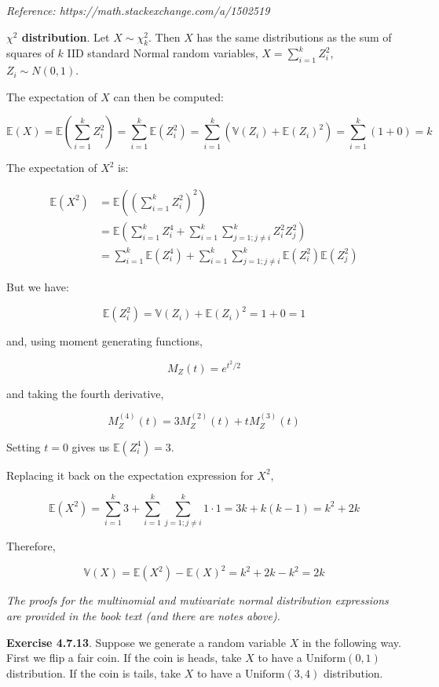 \emph{Reference: https://math.stackexchange.com/a/1502519}

\textbf{\(\chi^2\) distribution}. Let \(X \sim \chi^2_k\). Then \(X\)
has the same distributions as the sum of squares of \(k\) IID standard
Normal random variables, \(X = \sum_{i=1}^k Z_i^2\),
\(Z_i \sim N(0, 1)\).

The expectation of \(X\) can then be computed:

\[ \mathbb{E}(X) = \mathbb{E}\left( \sum_{i=1}^k Z_i^2 \right) = \sum_{i=1}^k \mathbb{E}(Z_i^2) = \sum_{i=1}^k (\mathbb{V}(Z_i) + \mathbb{E}(Z_i)^2) = \sum_{i=1}^k (1 + 0) = k \]

The expectation of \(X^2\) is:

\begin{align}
\mathbb{E}(X^2) &= \mathbb{E}\left( \left( \sum_{i=1}^k Z_i^2 \right)^2 \right) \\
&= \mathbb{E}\left( \sum_{i=1}^k Z_i^4 + \sum_{i=1}^k \sum_{j=1; j \neq i}^k Z_i^2 Z_j^2 \right) \\
&= \sum_{i=1}^k \mathbb{E}(Z_i^4) + \sum_{i=1}^k \sum_{j=1; j \neq i}^k \mathbb{E}(Z_i^2) \mathbb{E}(Z_j^2)
\end{align}

But we have:

\[ \mathbb{E}(Z_i^2) = \mathbb{V}(Z_i) + \mathbb{E}(Z_i)^2 = 1 + 0 = 1 \]

and, using moment generating functions,

\[M_Z(t) = e^{t^2 / 2}\]

and taking the fourth derivative,

\[ M_Z^{(4)}(t) = 3 M_Z^{(2)}(t) + t M_Z^{(3)}(t)\]

Setting \(t = 0\) gives us \(\mathbb{E}(Z_i^4) = 3\).

Replacing it back on the expectation expression for \(X^2\),

\[
\mathbb{E}(X^2) = \sum_{i=1}^k 3 + \sum_{i=1}^k \sum_{j=1; j \neq i}^k 1 \cdot 1 = 3k + k(k-1) = k^2 + 2k
\]

Therefore,

\[ \mathbb{V}(X) = \mathbb{E}(X^2) - \mathbb{E}(X)^2 = k^2 + 2k - k^2 = 2k \]

\emph{The proofs for the multinomial and mutivariate normal distribution
expressions are provided in the book text (and there are notes above).}

\textbf{Exercise 4.7.13}. Suppose we generate a random variable \(X\) in
the following way. First we flip a fair coin. If the coin is heads, take
\(X\) to have a \(\text{Uniform}(0, 1)\) distribution. If the coin is
tails, take \(X\) to have a \(\text{Uniform}(3, 4)\) distribution.

